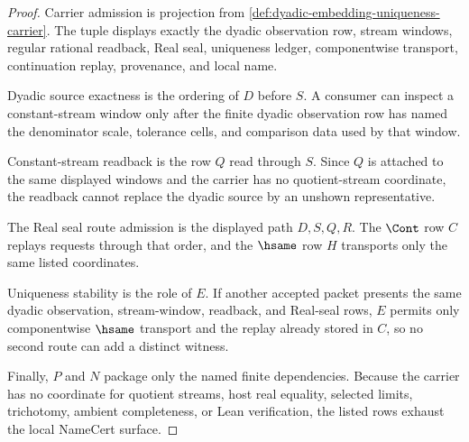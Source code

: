 \begin{proof}
Carrier admission is projection from \autoref{def:dyadic-embedding-uniqueness-carrier}. The tuple displays exactly the dyadic observation row, stream windows, regular rational readback, Real seal, uniqueness ledger, componentwise transport, continuation replay, provenance, and local name.

Dyadic source exactness is the ordering of $D$ before $S$. A consumer can inspect a constant-stream window only after the finite dyadic observation row has named the denominator scale, tolerance cells, and comparison data used by that window.

Constant-stream readback is the row $Q$ read through $S$. Since $Q$ is attached to the same displayed windows and the carrier has no quotient-stream coordinate, the readback cannot replace the dyadic source by an unshown representative.

The Real seal route admission is the displayed path $D,S,Q,R$. The $\Cont$ row $C$ replays requests through that order, and the $\hsame$ row $H$ transports only the same listed coordinates.

Uniqueness stability is the role of $E$. If another accepted packet presents the same dyadic observation, stream-window, readback, and Real-seal rows, $E$ permits only componentwise $\hsame$ transport and the replay already stored in $C$, so no second route can add a distinct witness.

Finally, $P$ and $N$ package only the named finite dependencies. Because the carrier has no coordinate for quotient streams, host real equality, selected limits, trichotomy, ambient completeness, or Lean verification, the listed rows exhaust the local NameCert surface.
\end{proof}

